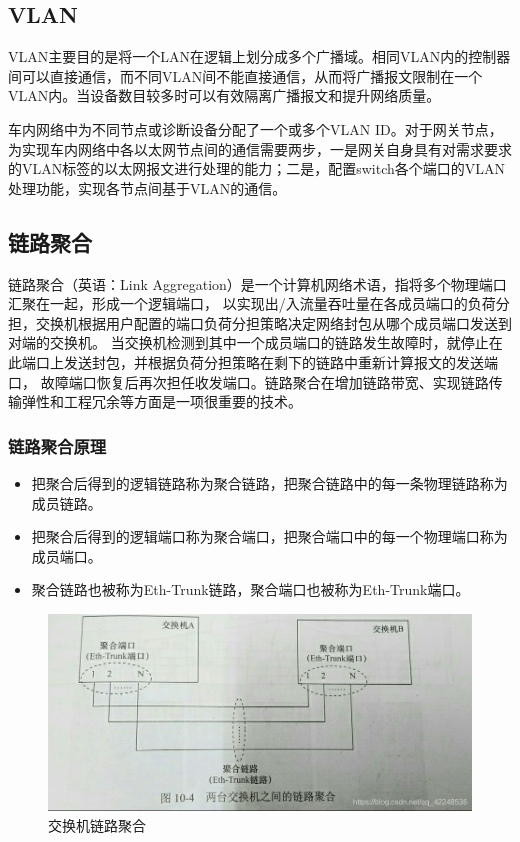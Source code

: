 \subsection{VLAN}
VLAN主要目的是将一个LAN在逻辑上划分成多个广播域。相同VLAN内的控制器间可以直接通信，而不同VLAN间不能直接通信，从而将广播报文限制在一个VLAN内。当设备数目较多时可以有效隔离广播报文和提升网络质量。

车内网络中为不同节点或诊断设备分配了一个或多个VLAN ID。对于网关节点，为实现车内网络中各以太网节点间的通信需要两步，一是网关自身具有对需求要求的VLAN标签的以太网报文进行处理的能力；二是，配置switch各个端口的VLAN处理功能，实现各节点间基于VLAN的通信。

\subsection{链路聚合}
链路聚合\cite{Link_Aggregation}（英语：Link Aggregation）是一个计算机网络术语，指将多个物理端口汇聚在一起，形成一个逻辑端口，
以实现出/入流量吞吐量在各成员端口的负荷分担，交换机根据用户配置的端口负荷分担策略决定网络封包从哪个成员端口发送到对端的交换机。
当交换机检测到其中一个成员端口的链路发生故障时，就停止在此端口上发送封包，并根据负荷分担策略在剩下的链路中重新计算报文的发送端口，
故障端口恢复后再次担任收发端口。链路聚合在增加链路带宽、实现链路传输弹性和工程冗余等方面是一项很重要的技术。

\subsubsection{链路聚合原理}

\begin{itemize}
    \item 把聚合后得到的逻辑链路称为聚合链路，把聚合链路中的每一条物理链路称为成员链路。
    \item 把聚合后得到的逻辑端口称为聚合端口，把聚合端口中的每一个物理端口称为成员端口。
    \item 聚合链路也被称为Eth-Trunk链路，聚合端口也被称为Eth-Trunk端口。
\end{itemize}

\begin{figure}[ht]
    \centering
    \includegraphics[scale=0.5]{pic/20190414170741211.jpg}
    \caption{交换机链路聚合}
    \label{fig:switch_link_aggre}
\end{figure}

